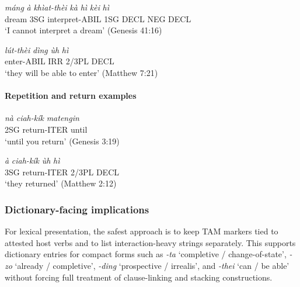 \documentclass[
  11pt,
  a4paper,
]{article}
\newcommand{\tdim}[1]{\textit{#1}}
\newcommand{\tdimword}[1]{\textit{#1}}
\renewcommand{\textsc}[1]{{\footnotesize\MakeUppercase{#1}}}
\newcommand{\glossquote}[1]{`#1'}
\begin{document}
\begin{exe}
\ex \label{ex:tam-thei-gen41}
\gll \tdimword{máng} \tdimword{à} \tdimword{khìat-thèi} \tdimword{kà} \tdimword{hì} \tdimword{kèi} \tdimword{hì} \\
     dream \textsc{3sg} interpret-\textsc{abil} \textsc{1sg} \textsc{decl} \textsc{neg} \textsc{decl} \\
\glt \glossquote{I cannot interpret a dream} (Genesis 41:16)
\end{exe}

\begin{exe}
\ex \label{ex:tam-thei-matt7}
\gll \tdimword{lút-thèi} \tdimword{dìng} \tdimword{ùh} \tdimword{hì} \\
     enter-\textsc{abil} \textsc{irr} 2/3PL \textsc{decl} \\
\glt \glossquote{they will be able to enter} (Matthew 7:21)
\end{exe}

\paragraph{Repetition and return
examples}\label{repetition-and-return-examples}

\begin{exe}
\ex \label{ex:tam-kik-gen3}
\gll \tdimword{nà} \tdimword{ciah-kík} \tdimword{matengin} \\
     \textsc{2sg} return-\textsc{iter} until \\
\glt \glossquote{until you return} (Genesis 3:19)
\end{exe}

\begin{exe}
\ex \label{ex:tam-kik-matt2}
\gll \tdimword{à} \tdimword{ciah-kík} \tdimword{ùh} \tdimword{hì} \\
     \textsc{3sg} return-\textsc{iter} 2/3PL \textsc{decl} \\
\glt \glossquote{they returned} (Matthew 2:12)
\end{exe}

\subsubsection{Dictionary-facing
implications}\label{dictionary-facing-implications-1}

For lexical presentation, the safest approach is to keep TAM markers
tied to attested host verbs and to list interaction-heavy strings
separately. This supports dictionary entries for compact forms such as
\tdim{-ta} \glossquote{completive / change-of-state}, \tdim{-zo}
\glossquote{already / completive}, \tdim{-ding}
\glossquote{prospective / irrealis}, and \tdim{-thei}
\glossquote{can / be able} without forcing full treatment of
clause-linking and stacking constructions.
\end{document}
